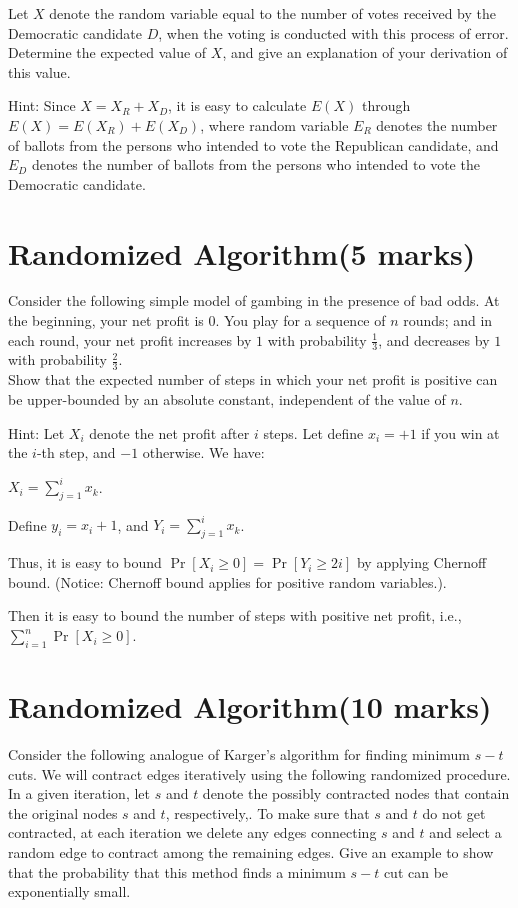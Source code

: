 \documentclass[a4paper,11pt]{article}
\begin{document}
		 Let $X$ denote the random variable equal to the number of votes received by the Democratic candidate $D$, when the voting is conducted with this process of error. Determine the expected value of $X$, and give an explanation of your derivation of this value.

Hint: Since $X=X_R+X_D$, it is easy to calculate $E(X)$ through $E(X)=E(X_R)+E(X_D)$, where random variable $E_R$ denotes the number of ballots from the persons who intended to vote the Republican candidate, and $E_D$ denotes the number of ballots from the persons who intended to vote the Democratic candidate.

\section{Randomized Algorithm(5 marks)}

Consider the following simple model of gambing in the presence of bad odds. At the beginning, your net profit is $0$. You play for a sequence of $n$ rounds; and in each round, your net profit increases by $1$ with probability $\frac{1}{3}$, and decreases by $1$ with probability $\frac{2}{3}$.\\

		 Show that the expected number of steps in which your net profit is positive can be upper-bounded by an absolute constant, independent of the value of $n$.

Hint: Let $X_i$ denote the net profit after $i$ steps. Let define $x_i=+1$ if you win at the $i$-th step, and $-1$ otherwise.  We have:

$X_i = \sum_{j=1}^i x_k$. 

Define $y_i = x_i + 1 $, and $Y_i=\sum_{j=1}^i x_k$. 

Thus, it is easy to bound $\Pr[ X_i \geq 0 ] = \Pr[ Y_i \geq 2i ]$ by applying Chernoff bound. (Notice: Chernoff bound applies for positive random variables.).

Then it is easy to bound the number of steps with positive net profit, i.e., $\sum_{i=1}^n \Pr[ X_i \geq 0 ]$. 

\section{Randomized Algorithm(10 marks)}

Consider the following analogue of Karger's algorithm for finding minimum $s-t$ cuts. We will contract edges iteratively using the following randomized procedure. In a given iteration, let $s$ and $t$ denote the possibly contracted nodes that contain the original nodes $s$ and $t$, respectively,. To make sure that $s$ and $t$ do not get contracted, at each iteration we delete any edges connecting $s$ and $t$ and select a random edge to contract among the remaining edges. Give an example to show that the probability that this method finds a minimum $s-t$ cut can be exponentially small.
\end{document}
